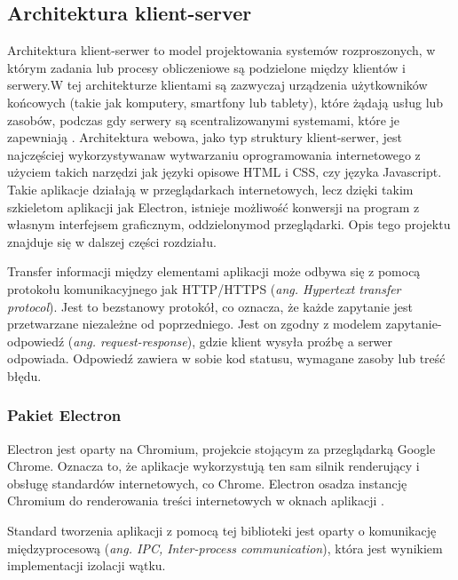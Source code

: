 \documentclass[12pt,a4paper,twoside]{article}
\begin{document}
\subsection{Architektura klient-server}
Architektura klient-serwer to model projektowania systemów rozproszonych, w którym zadania lub procesy obliczeniowe są podzielone między klientów i serwery.\break W tej architekturze klientami są zazwyczaj urządzenia użytkowników końcowych (takie jak komputery, smartfony lub tablety), które żądają usług lub zasobów, podczas gdy serwery są scentralizowanymi systemami, które je zapewniają \cite{client}. Architektura webowa, jako typ struktury klient-serwer, jest najczęściej wykorzystywana\break w wytwarzaniu oprogramowania internetowego z użyciem takich narzędzi jak języki opisowe HTML i CSS, czy języka Javascript. Takie aplikacje działają w przeglądarkach internetowych, lecz dzięki takim szkieletom aplikacji jak Electron, istnieje możliwość konwersji na program z własnym interfejsem graficznym, oddzielonym\break od przeglądarki. Opis tego projektu znajduje się w dalszej części rozdziału.\par
Transfer informacji między elementami aplikacji może odbywa się z pomocą protokołu komunikacyjnego jak HTTP/HTTPS (\textit{ang. Hypertext transfer protocol}). Jest to bezstanowy protokół, co oznacza, że każde zapytanie jest przetwarzane niezależne od poprzedniego. Jest on zgodny z modelem zapytanie-odpowiedź (\textit{ang. request-response}), gdzie klient wysyła proźbę a serwer odpowiada. Odpowiedź zawiera w sobie kod statusu, wymagane zasoby lub treść błędu.\par
\subsubsection{Pakiet Electron}
Electron jest oparty na Chromium, projekcie stojącym za przeglądarką Google Chrome. Oznacza to, że aplikacje wykorzystują ten sam silnik renderujący i obsługę standardów internetowych, co Chrome. Electron osadza instancję Chromium do renderowania treści internetowych w oknach aplikacji \cite{electron}.\par
Standard tworzenia aplikacji z pomocą tej biblioteki jest oparty o komunikację międzyprocesową (\textit{ang. IPC, Inter-process communication}), która jest wynikiem implementacji izolacji wątku. 
\end{document}
